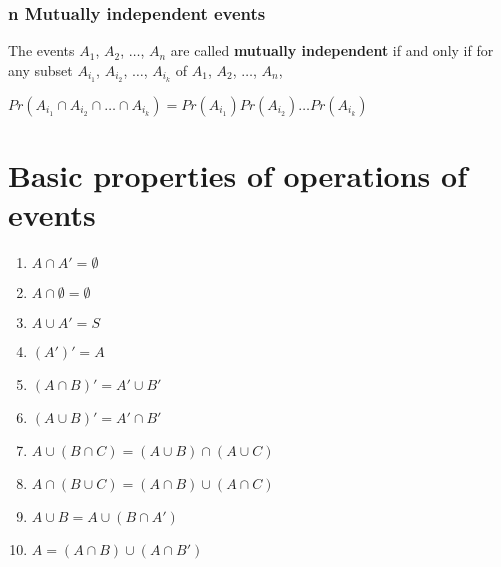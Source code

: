 \documentclass[a4paper]{article}
\begin{document}
\subsubsection{n Mutually independent events}
The events $A_1$, $A_2$, $\dots$, $A_n$ are called \textbf{mutually independent} if and only if for any subset {$A_{i_1}$, $A_{i_2}$, $\dots$, $A_{i_k}$} of $A_1$, $A_2$, $\dots$, $A_n$,
\begin{center}
	$Pr(A_{i_1} \cap A_{i_2} \cap \dots \cap A_{i_k}) = Pr(A_{i_1})Pr(A_{i_2})\dots Pr(A_{i_k})$
\end{center}
\newpage
\appendix
\section{Basic properties of operations of events}
\begin{enumerate}
	\item $A \cap A' = \emptyset$
	\item $A \cap \emptyset = \emptyset$
	\item $A \cup A' = S$
	\item $(A')' = A$
	\item $(A \cap B)' = A' \cup B'$
	\item $(A \cup B)' = A' \cap B'$
	\item $A \cup (B \cap C) = (A \cup B) \cap (A \cup C)$
	\item $A \cap (B \cup C) = (A \cap B) \cup (A \cap C)$
	\item $A \cup B = A \cup (B \cap A')$
	\item $A = (A \cap B) \cup (A \cap B')$
\end{enumerate}
\end{document}
